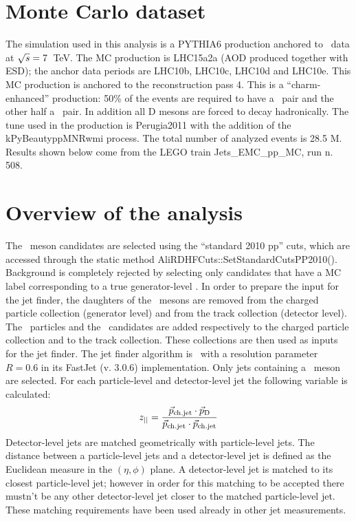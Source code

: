 \section{Monte Carlo dataset}
The simulation used in this analysis is a PYTHIA6 production anchored to \pp\ data at $\sqrt{s}=7$~TeV.
The MC production is LHC15a2a (AOD produced together with ESD); the anchor data periods are LHC10b, LHC10c, LHC10d and LHC10e.
This MC production is anchored to the reconstruction pass 4.
This is a ``charm-enhanced'' production: 50\% of the events are required to have a \ccbar\ pair and the other half a \bbbar\ pair.
In addition all D mesons are forced to decay hadronically. The tune used in the production is Perugia2011 with the addition of the 
{\fontfamily{\ttdefault}kPyBeautyppMNRwmi} process.
The total number of analyzed events is 28.5 M. Results shown below come from the LEGO train Jets\_EMC\_pp\_MC, run n. 508.
\section{Overview of the analysis}
The \Dzero\ meson candidates are selected using the ``standard 2010 pp'' cuts, which are accessed through the static method AliRDHFCuts::SetStandardCutsPP2010(). 
Background is completely rejected by selecting only candidates that
have a MC label corresponding to a true generator-level \Dzero. In order to prepare the input for the jet finder, the daughters of the \Dzero\ mesons are 
removed from the charged particle collection (generator level) and from the track collection (detector level). The \Dzero\ particles and the \Dzero\ candidates are
added respectively to the charged particle collection and to the track collection. These collections are then used as inputs for the jet finder.
The jet finder algorithm is \antikt\ with a resolution parameter $R=0.6$ in its FastJet (v. 3.0.6) implementation.
Only jets containing a \Dzero\ meson are selected. For each particle-level and detector-level jet the following variable is calculated:
\begin{equation}
z_{||}=\frac{\vec{p}_{\mathrm{ch.jet}}\cdot\vec{p}_{\mathrm{D}}}{\vec{p}_{\mathrm{ch.jet}}\cdot\vec{p}_{\mathrm{ch.jet}}}
\end{equation}
Detector-level jets are matched geometrically with particle-level jets. The distance between a particle-level jets and a detector-level jet is defined 
as the Euclidean measure in the $\left(\eta,\phi\right)$ plane. A detector-level jet is matched to its closest particle-level jet; however in order for this matching to be accepted
there mustn't be any other detector-level jet closer to the matched particle-level jet. These matching requirements have been used 
already in other jet measurements.

